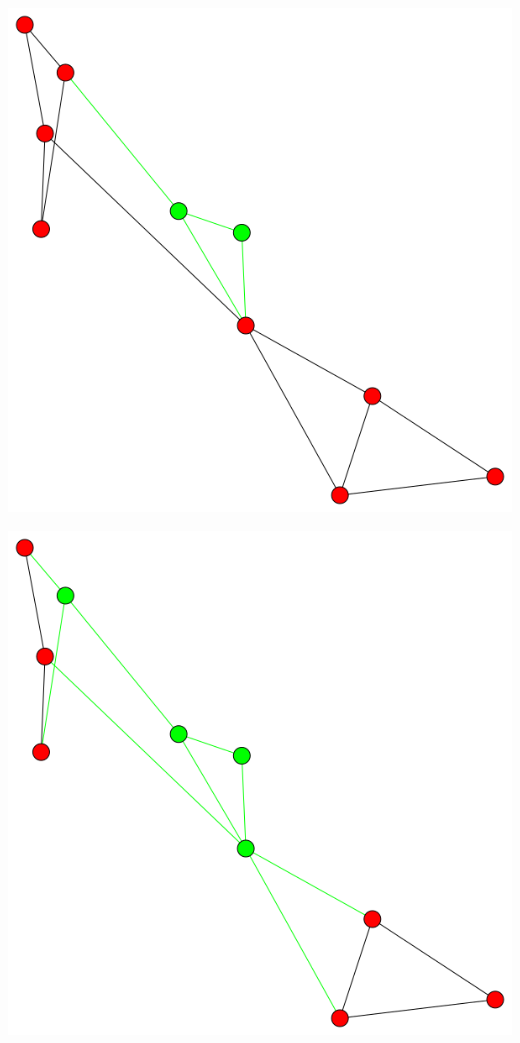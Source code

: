 \documentclass[12pt]{article}
\begin{document}
\begin{minipage}[t]{0.3\textwidth}
\includegraphics[width=\textwidth]{cascadeHomo/cascade0.png}
\end{minipage}
\begin{minipage}[t]{0.3\textwidth}
\includegraphics[width=\textwidth]{cascadeHomo/cascade1.png}
\end{minipage}
\end{document}
